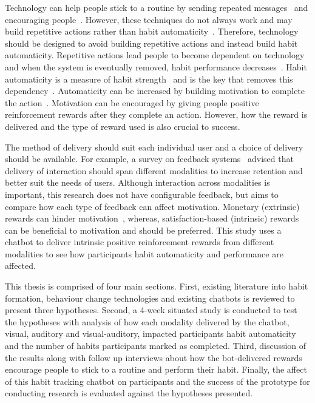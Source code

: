 Technology can help people stick to a routine by sending repeated messages~\cite{chi_crowd_designed_motivation} and encouraging people~\cite{positive_reinforcement_pro}. However, these techniques do not always work and may build repetitive actions rather than habit automaticity~\cite{coaching_not_that_good}. Therefore, technology should be designed to avoid building repetitive actions and instead build habit automaticity. Repetitive actions lead people to become dependent on technology and when the system is eventually removed, habit performance decreases~\cite{article_dont_kick_habit, article_realtime_feedback_improving_medication_taking}. Habit automaticity is a measure of habit strength~\cite{article_4q_SRBAI} and is the key that removes this dependency~\cite{article_beyond_self_tracking_designing_apps}. Automaticity can be increased by building motivation to complete the action~\cite{article_a_self_efficacy, article_meta_analytic_review_intrinsic_motivation}.
Motivation can be encouraged by giving people positive reinforcement rewards after they complete an action. However, how the reward is delivered and the type of reward used is also crucial to success.

The method of delivery should suit each individual user and a choice of delivery should be available. For example, a survey on feedback systems~\cite{article_user_centred_multimodal_reminders} advised that delivery of interaction should span different modalities to increase retention and better suit the needs of users. Although interaction across modalities is important, this research does not have configurable feedback, but aims to compare how each type of feedback can affect motivation. Monetary (extrinsic) rewards can hinder motivation~\cite{article_meta_analytic_review_intrinsic_motivation}, whereas, satisfaction-based (intrinsic) rewards can be beneficial to motivation and should be preferred.
This study uses a chatbot to deliver intrinsic positive reinforcement rewards from different modalities to see how participants habit automaticity and performance are affected.

This thesis is comprised of four main sections. First, existing literature into habit formation, behaviour change technologies and existing chatbots is reviewed to present three hypotheses. Second, a 4-week situated study is conducted to test the hypotheses with analysis of how each modality delivered by the chatbot, visual, auditory and visual-auditory, impacted participants habit automaticity and the number of habits participants marked as completed. Third, discussion of the results along with follow up interviews about how the bot-delivered rewards encourage people to stick to a routine and perform their habit. Finally, the affect of this habit tracking chatbot on participants and the success of the prototype for conducting research is evaluated against the hypotheses presented.

